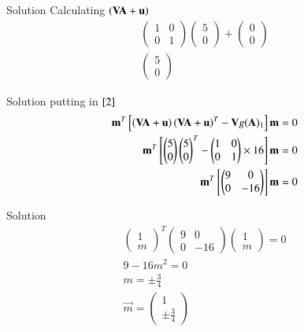 \documentclass{beamer}
\begin{document}
\begin{frame}{Solution}
Calculating $\left(\mathbf{V}\mathbf{A}+\mathbf{u}\right)$
\begin{align}
    \begin{pmatrix}1&0\\0&1\end{pmatrix}\begin{pmatrix}5\\0\end{pmatrix}+\begin{pmatrix}0\\0\end{pmatrix}\\
    \begin{pmatrix}5\\0\end{pmatrix}    
\end{align}
\end{frame}
\begin{frame}{Solution}
putting in $\eqref{2}$
\begin{align}
    \mathbf{m}^T{}\left[\left(\mathbf{V}\mathbf{A}+\mathbf{u}\right)\left(\mathbf{V}\mathbf{A}+\mathbf{u}\right)^T-\mathbf{V}g(\mathbf{A})_1\right]\mathbf{m}=0\\
    \mathbf{m}^T{}\left[\begin{pmatrix}5\\0\end{pmatrix}\begin{pmatrix}5\\0\end{pmatrix}^T-\begin{pmatrix}1&0\\0&1\end{pmatrix}\times16\right]\mathbf{m}=0\\
    \mathbf{m}^T{}\left[\begin{pmatrix}9&0\\0&-16\end{pmatrix}\right]\mathbf{m}=0\end{align}
    \end{frame}
\begin{frame}{Solution}
    \begin{align}
    \begin{pmatrix}1\\m\end{pmatrix}^T\begin{pmatrix}9&0\\0&-16\end{pmatrix}\begin{pmatrix}1\\m\end{pmatrix}=0\\
    9-16m^2=0\\
    m=\pm \frac{3}{4}\\
    \vec{m}=\begin{pmatrix}1\\\pm \frac{3}{4}\end{pmatrix}
\end{align}
\end{frame}
\end{document}
